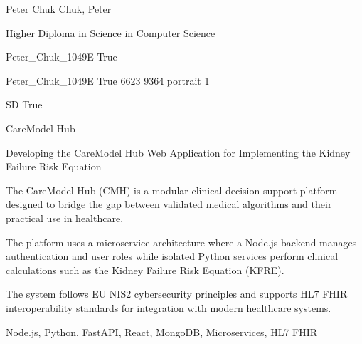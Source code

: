 \documentclass[twoside]{report}
\begin{document}
\begingroup{}\relax



\def\Key{Peter_Chuk_1049E}

{Peter Chuk}
{Chuk, Peter}

{Higher Diploma in Science in Computer Science}

{Peter_Chuk_1049E}
{True}

{Peter_Chuk_1049E}
{True}
{6623}
{9364}
{portrait}
{1}

{SD}
{True}

{CareModel Hub}

{Developing the CareModel Hub Web Application for Implementing the Kidney Failure Risk Equation}

{The CareModel Hub (CMH) is a modular clinical decision support platform designed to bridge the gap between validated medical algorithms and their practical use in healthcare.

The platform uses a microservice architecture where a Node.js backend manages authentication and user roles while isolated Python services perform clinical calculations such as the Kidney Failure Risk Equation (KFRE).

The system follows EU NIS2 cybersecurity principles and supports HL7 FHIR interoperability standards for integration with modern healthcare systems.}

{Node.js, Python, FastAPI, React, MongoDB, Microservices, HL7 FHIR}
\end{document}
